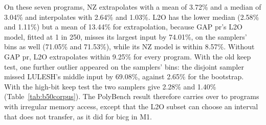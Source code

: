 \documentclass[11pt]{article}
\begin{document}
On these seven programs, NZ extrapolates with a mean of 3.72\% and a median of 3.04\% and interpolates with 2.64\%
and 1.03\%. L2O has the lower median (2.58\% and 1.11\%) but a mean of 13.44\% for extrapolation, because GAP pr's
L2O model, fitted at 1 in 250, misses its largest input by 74.01\%, on the samplers' bins as well (71.05\% and
71.53\%), while its NZ model is within 8.57\%. Without GAP pr, L2O extrapolates within 9.25\% for every program. With
the old keep test, one further outlier appeared on the samplers' bins: the disjoint sampler missed LULESH's middle
input by 69.08\%, against 2.65\% for the bootstrap. With the high-bit keep test the two samplers give 2.28\% and
1.40\% (Table~\ref{tab:b50corpus}). The PolyBench result therefore carries over to programs with irregular memory
access, except that the L2O subset can choose an interval that does not transfer, as it did for bicg in M1.
\end{document}
